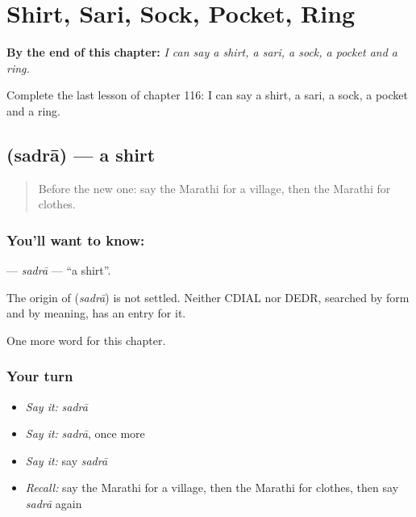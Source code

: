 
\chapter{Shirt, Sari, Sock, Pocket, Ring}
\label{ch:mr-shirt-sari-sock-pocket-ring}

\begin{chapteropening}
\textbf{By the end of this chapter:} \emph{I can say a shirt, a sari, a sock, a pocket and a ring.}

Complete the last lesson of chapter 116: I can say a shirt, a sari, a sock, a pocket and a ring.
\end{chapteropening}

\section[\texorpdfstring{\mr{सदरा} (sadrā)}{सदरा (sadrā)}]{ (sadrā) — a shirt}

\label{lesson:MR-C116-sadra}



\begin{quote}
Before the new one: say the Marathi for a village, then the Marathi for clothes.
\end{quote}

\subsection*{You'll want to know: }
\textbf{} — \emph{sadrā} — \textquotedblleft{}a shirt\textquotedblright{}.

\begin{cousinweb}
The origin of \textbf{} (\emph{sadrā}) is not settled. Neither CDIAL nor DEDR, searched by form and by meaning, has an entry for it.
\end{cousinweb}

\begin{grammarlens}[title={What you've built}]
One more word for this chapter.
\end{grammarlens}

\subsection*{Your turn}
\begin{itemize}
\raggedright
  \item \emph{Say it:} \emph{sadrā}
  \item \emph{Say it:} \emph{sadrā}, once more
  \item \emph{Say it:} say \emph{sadrā}
  \item \emph{Recall:} say the Marathi for a village, then the Marathi for clothes, then say \emph{sadrā} again
\end{itemize}

